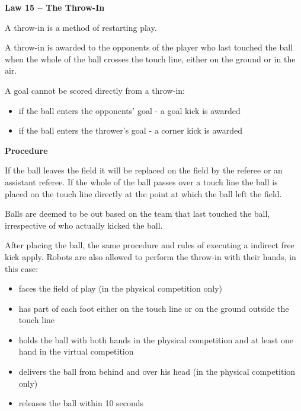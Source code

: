 \clearpage
\sffamily
{\bfseries
\textcolor[rgb]{0.4,0.4,0.4}{Law 15 -- The Throw-In} }
{}


\bigskip

A throw-in is a method of restarting play.

\bigskip

A throw-in is awarded to the opponents of the player who last touched the ball when the whole of the ball crosses the touch line, either on the ground or in the air.


\bigskip

A goal cannot be scored directly from a throw-in:
\begin{itemize}
\item if the ball enters the opponents' goal - a goal kick is awarded
\item if the ball enters the thrower's goal - a corner kick is awarded
\end{itemize}

\bigskip

{\bfseries Procedure }

\headlinebox 

If the ball leaves the field it will be replaced on the field by the referee or
an assistant referee.
If the whole of the ball passes over a touch line the ball is placed on the
touch line directly at the point at which the ball left the field.

\bigskip

Balls are deemed to be out based on the team that last touched the ball,
irrespective of who actually kicked the ball.

\bigskip

After placing the ball, the same procedure and rules of executing a indirect free kick apply.
Robots are also allowed to perform the throw-in with their hands, in this case:

\begin{itemize}
\item faces the field of play (in the physical competition only)
\item has part of each foot either on the touch line or on the ground outside
      the touch line
\item holds the ball with both hands in the physical competition and at least one hand in the virtual competition
\item delivers the ball from behind and over his head (in the physical competition only)

\item releases the ball within 10 seconds
\end{itemize}

